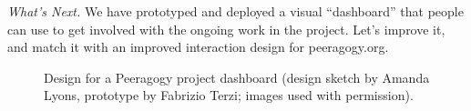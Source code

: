 \begin{framed}
\noindent 
\emph{What's Next.}
We have prototyped and deployed a visual ``dashboard'' that people can use to get involved with the ongoing work in the project.  Let's improve it, and match it with an improved interaction design for peeragogy.org.
\end{framed}    


\begin{figure}
\caption{Design for a Peeragogy project dashboard (design sketch by Amanda Lyons, prototype by Fabrizio Terzi; images used with permission).\label{dashboard}}
\end{figure}

